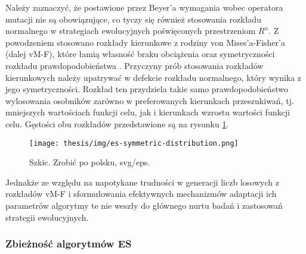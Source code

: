     Należy zaznaczyć, że postawione przez Beyer'a wymagania wobec operatora mutacji nie są obowiązujące, co tyczy się również stosowania rozkładu normalnego w strategiach ewolucyjnych poświęconych przestrzeniom $R^{n}$. Z powodzeniem stosowano rozkłady kierunkowe z rodziny von Mises'a-Fisher'a (dalej vM-F), które łamią własność braku obciążenia oraz symetryczności rozkładu prawdopodobieństwa \cite{Obuchowicz:2006}. Przyczyny prób stosowania rozkładów kierunkowych należy upatrywać w defekcie rozkładu normalnego, który wynika z jego symetryczności. Rozkład ten przydziela takie samo prawdopodobieństwo wylosowania osobników zarówno w preferowanych kierunkach przeszukiwań, tj. mniejszych wartościach funkcji celu, jak i kierunkach wzrostu wartości funkcji celu. Gęstości obu rozkładów przedstawione są na rysunku \ref{fig:vM-F}.
     \begin{figure}[h]
        \centering
        \texttt{[image: thesis/img/es-symmetric-distribution.png]}
        \caption{Szkic. Zrobić po polsku, svg/eps.}
        \label{fig:vM-F}
    \end{figure}
    Jednakże ze względu na napotykane trudności w generacji liczb losowych z rozkładów vM-F i sformułowania efektywnych mechanizmów adaptacji ich parametrów algorytmy te nie weszły do głównego nurtu badań i zastosowań strategii ewolucyjnych. 
    
\subsubsection{Zbieżność algorytmów ES}

